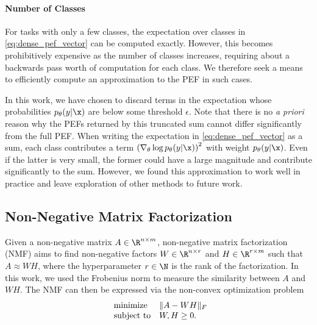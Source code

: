 \documentclass[dvipsnames]{article}
\begin{document}
\paragraph{Number of Classes}
For tasks with only a few classes, the expectation over classes in \eqref{eq:dense_pef_vector} can be computed exactly.
However, this becomes prohibitively expensive as the number of classes increases, requiring about a backwards pass worth of computation for each class.
We therefore seek a means to efficiently compute an approximation to the PEF in such cases.

In this work, we have chosen to discard terms in the expectation whose probabilities $p_\theta(y|\x)$ are below some threshold $\epsilon$.
Note that there is no \textit{a priori} reason why the PEFs returned by this truncated sum cannot differ significantly from the full PEF.
When writing the expectation in \eqref{eq:dense_pef_vector} as a sum, each class contributes a term $\left(\nabla_\theta \log p_\theta(y|\x)\right)^2$ with weight $p_\theta(y|\x)$.
Even if the latter is very small, the former could have a large magnitude and contribute significantly to the sum.
However, we found this approximation to work well in practice and leave exploration of other methods to future work.

\subsection{Non-Negative Matrix Factorization}

Given a non-negative matrix $A \in \R^{n\times m}$, non-negative matrix factorization (NMF) aims to find non-negative factors $W \in \R^{n\times r}$ and $H \in \R^{r\times m}$ such that $A \approx WH$, where the hyperparameter $r\in\N$ is the rank of the factorization.
In this work, we used the Frobenius norm to measure the similarity between $A$ and $WH$.
The NMF can then be expressed via the non-convex optimization problem
\begin{equation}\label{eq:nmf_nc_opt}
\begin{array}{ll@{}ll}
\text{minimize}  & \|A - WH\|_F \\
\text{subject to} & W,H \geq 0. \\
\end{array}
\end{equation}
\end{document}
